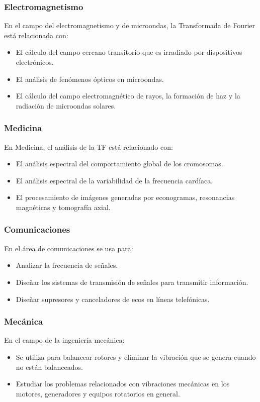 \begin{frame}
\frametitle{Electromagnetismo}
En el campo del electromagnetismo y de microondas, la Transformada de Fourier está relacionada con:
\pause
\begin{itemize}
\item El cálculo del campo cercano transitorio que es irradiado por dispositivos electrónicos.
\item El análisis de fenómenos ópticos en microondas.
\item El cálculo del campo electromagnético de rayos, la formación de haz y la radiación de microondas solares.
\end{itemize}
\end{frame}
\begin{frame}
\frametitle{Medicina}    
En Medicina, el análisis de la TF está relacionado con:
\pause
\begin{itemize}
\item El análisis espectral del comportamiento global de los cromosomas.
\item El análisis espectral de la variabilidad de la frecuencia cardíaca.
\item El procesamiento de imágenes generadas por econogramas, resonancias magnéticas y tomografía axial.
\end{itemize}
\end{frame}
\begin{frame}
\frametitle{Comunicaciones}    
En el área de comunicaciones se usa para:
\pause
\begin{itemize}
\item Analizar la frecuencia de señales.
\item Diseñar los sistemas de transmisión de señales para transmitir información.
\item Diseñar supresores y canceladores de ecos en líneas telefónicas.
\end{itemize}
\end{frame}
\begin{frame}
\frametitle{Mecánica}    
En el campo de la ingeniería mecánica:
\pause
\begin{itemize}
\item  Se utiliza para balancear rotores y eliminar la vibración que se genera cuando no están balanceados.
\item Estudiar los problemas relacionados con vibraciones mecánicas en los motores, generadores y equipos rotatorios en general.
\end{itemize}
\end{frame}
